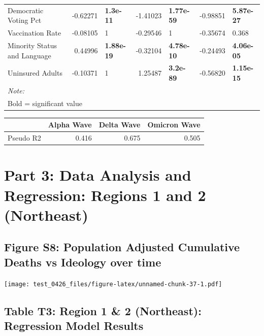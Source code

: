 \documentclass[
]{article}
\begin{document}
\begin{table}
\begin{tabular}{lrlrlrl}
Democratic Voting Pct & -0.62271 & \textbf{1.3e-11} & -1.41023 & \textbf{1.77e-59} & -0.98851 & \textbf{5.87e-27}\\
Vaccination Rate & -0.08105 & 1 & -0.29546 & 1 & -0.35674 & 0.368\\
Minority Status and Language & 0.44996 & \textbf{1.88e-19} & -0.32104 & \textbf{4.78e-10} & -0.24493 & \textbf{4.06e-05}\\
\addlinespace
Uninsured Adults & -0.10371 & 1 & 1.25487 & \textbf{3.2e-89} & -0.56820 & \textbf{1.15e-15}\\
\bottomrule
\multicolumn{7}{l}{\rule{0pt}{1em}\textit{Note: }}\\
\multicolumn{7}{l}{\rule{0pt}{1em}Bold = significant value}\\
\end{tabular}
\end{table}

\begin{table}
\centering
\begin{tabular}{lrrr}
\toprule
  & Alpha Wave & Delta Wave & Omicron Wave\\
\midrule
Pseudo R2 & 0.416 & 0.675 & 0.505\\
\bottomrule
\end{tabular}
\end{table}

\newpage

\newpage

\hypertarget{part-3-data-analysis-and-regression-regions-1-and-2-northeast}{%
\section{Part 3: Data Analysis and Regression: Regions 1 and 2
(Northeast)}\label{part-3-data-analysis-and-regression-regions-1-and-2-northeast}}

\hypertarget{figure-s8-population-adjusted-cumulative-deaths-vs-ideology-over-time}{%
\subsection{Figure S8: Population Adjusted Cumulative Deaths vs Ideology
over
time}\label{figure-s8-population-adjusted-cumulative-deaths-vs-ideology-over-time}}

\texttt{[image: test\_0426\_files/figure-latex/unnamed-chunk-37-1.pdf]}

\hypertarget{table-t3-region-1-2-northeast-regression-model-results}{%
\subsection{Table T3: Region 1 \& 2 (Northeast): Regression Model
Results}\label{table-t3-region-1-2-northeast-regression-model-results}}
\end{document}
